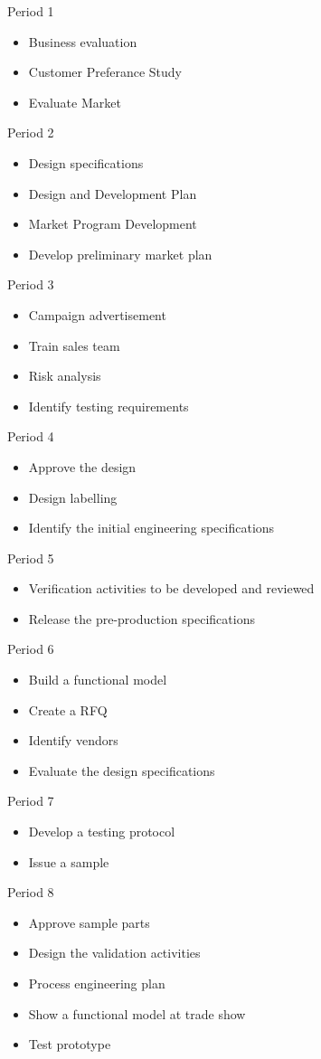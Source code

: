 Period 1
\begin{itemize}
\item Business evaluation
\item Customer Preferance Study
\item Evaluate Market
\end{itemize}
Period 2
\begin{itemize}
\item Design specifications
\item Design and Development Plan
\item Market Program Development
\item Develop preliminary market plan
\end{itemize}
Period 3
\begin{itemize}
\item Campaign advertisement
\item Train sales team
\item Risk analysis
\item Identify testing requirements
\end{itemize}
Period 4
\begin{itemize}
\item Approve the design
\item Design labelling
\item Identify the initial engineering specifications
\end{itemize}
Period 5
\begin{itemize}
\item Verification activities to be developed and reviewed
\item Release the pre-production specifications
\end{itemize}
Period 6
\begin{itemize}
\item Build a functional model
\item Create a RFQ
\item Identify vendors
\item Evaluate the design specifications
\end{itemize}
Period 7
\begin{itemize}
\item Develop a testing protocol
\item Issue a sample
\end{itemize}
Period 8
\begin{itemize}
\item Approve sample parts
\item Design the validation activities
\item Process engineering plan
\item Show a functional model at trade show
\item Test prototype
\end{itemize}
